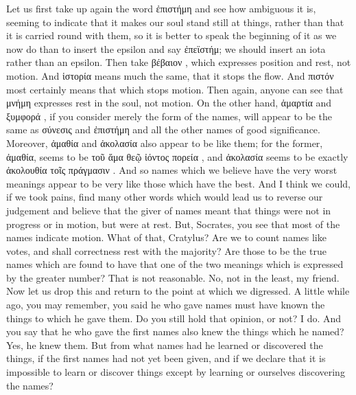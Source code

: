 {{{{{Let us first take up again the word ἐπιστήμη  and see how ambiguous it is, seeming to indicate that it makes our soul stand still  at things, rather than that it is carried round with them, so it is better to speak the beginning of it as we now do than to insert the epsilon and say ἐπεϊστήμ; we should insert an iota rather than an epsilon. Then take βέβαιον , which expresses position and rest, not motion.  And ἱστορία  means much the same, that it stops  the flow. And πιστόν  most certainly means that which stops  motion. Then again, anyone can see that μνήμη  expresses rest  in the soul, not motion. On the other hand, ἁμαρτία  and ξυμφορά , if you consider merely the form of the names, will appear to be the same as σύνεσις  and ἐπιστήμη and all the other names of good significance. Moreover, ἀμαθία  and ἀκολασία  also appear to be like them; for the former, ἀμαθία,  seems to be τοῦ ἅμα θεῷ ἰόντος πορεία , and ἀκολασία seems to be exactly ἀκολουθία τοῖς πράγμασιν . And so names which we believe have the very worst meanings appear to be very like those which have the best. And I think we could, if we took pains, find many other words which would lead us to reverse our judgement and believe that the giver of names meant that things were not in progress or in motion, but were at rest.
\cratylusspeaks
But, Socrates, you see that most of the names  indicate motion.
\socratesspeaks
What of that, Cratylus? Are we to count names like votes, and shall correctness rest with the majority? Are those to be the true names which are found to have that one of the two meanings which is expressed by the greater number?
\cratylusspeaks
That is not reasonable.
\socratesspeaks
No, not in the least, my friend.  Now let us drop this and return to the point at which we digressed. A little while ago, you may remember, you said he who gave names must have known the things to which he gave them. Do you still hold that opinion, or not?
\cratylusspeaks
I do.
\socratesspeaks
And you say that he who gave the first names also knew the things which he named?
\cratylusspeaks
Yes, he knew them.
\socratesspeaks
But from what names had he learned or discovered the things,  if the first names had not yet been given, and if we declare that it is impossible to learn or discover things except by learning or ourselves discovering the names?
}}}}}
